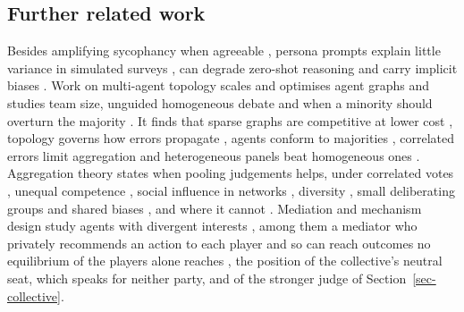\subsection{Further related work}
\label{app-related}
Besides amplifying sycophancy when agreeable \citep{shah2026toonice},
persona prompts explain little variance in simulated surveys
\citep{hu2024persona}, can degrade zero-shot reasoning \citep{kim2025persona}
and carry implicit biases \citep{gupta2024bias,deshpande2023toxicity}.
Work on multi-agent topology scales and optimises agent graphs
\citep{qian2025macnet,zhuge2024gptswarm,liu2024dylan} and studies team size,
unguided homogeneous debate and when a minority should overturn the majority
\citep{bertalanic2026ringelmann,bertalanic2026costconsensus,he2026minoritysentinel}.
It finds that sparse graphs are competitive at lower cost \citep{li2024sparse},
topology governs how errors propagate
\citep{shen2025propagation,han2026conformity}, agents conform to majorities
\citep{zhang2024socialpsych,weng2025conformity}, correlated errors limit
aggregation \citep{kim2025correlated} and heterogeneous panels beat
homogeneous ones \citep{wang2025moa}.
Aggregation theory states when pooling judgements helps, under correlated
votes \citep{ladha1992condorcet,boland1989majority}, unequal competence
\citep{shapley1984optimizing,nitzan1982optimal,bahrami2010optimally}, social
influence in networks
\citep{degroot1974reaching,golub2010naive,lorenz2011social,becker2017network},
diversity \citep{zollman2010epistemic,hong2004groups,thompson2014diversity},
small deliberating groups \citep{navajas2018aggregated} and shared biases
\citep{prelec2017solution}, and where it cannot \citep{list2002aggregating}.
Mediation and mechanism design study agents with divergent interests
\citep{dafoe2020cooperative,akata2025repeated,piatti2024cooperate,leon2026personas,tewolde2026coopeval},
among them a mediator who privately recommends an action to each player and
so can reach outcomes no equilibrium of the players alone reaches
\citep{aumann1974subjectivity}, the position of the collective's neutral seat,
which speaks for neither party, and of the stronger judge of
Section~\ref{sec-collective}.
